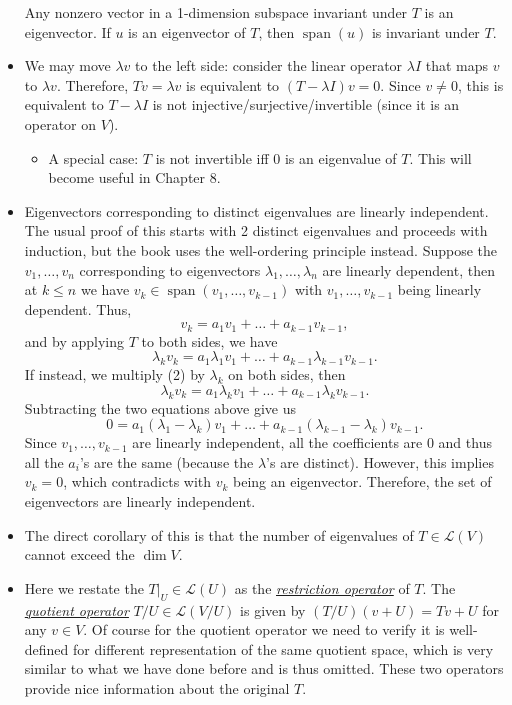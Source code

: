 \documentclass{article}
\newcommand{\df}[1]{\ul{\textit{#1}}}
\newcommand{\s}{\operatorname{span}}
\renewcommand{\d}{\dim}
\newcommand{\LV}{\mathcal{L}(V)}
\newcommand{\bv}{v_1,\dots,v_n}
\begin{document}
\begin{itemize}
    Any nonzero vector in a 1-dimension subspace invariant under $T$ is an eigenvector. If $u$ is an eigenvector of $T$, then $\s(u)$ is invariant under $T$.
    \item We may move $\lambda v$ to the left side: consider the linear operator $\lambda I$ that maps $v$ to $\lambda v$. Therefore, $Tv = \lambda v$ is equivalent to $(T-\lambda I) v = 0$. Since $v \not= 0$, this is equivalent to $T-\lambda I$ is not injective/surjective/invertible (since it is an operator on $V$).
    \begin{itemize}
        \item A special case: $T$ is not invertible iff 0 is an eigenvalue of $T$. This will become useful in Chapter 8.
    \end{itemize}
    \item Eigenvectors corresponding to distinct eigenvalues are linearly independent. The usual proof of this starts with 2 distinct eigenvalues and proceeds with induction, but the book uses the well-ordering principle instead. Suppose the $\bv$ corresponding to eigenvectors $\lambda_1,\dots,\lambda_n$ are linearly dependent, then at $k \leq n$ we have $v_k \in \s(v_1,\dots,v_{k-1})$ with $v_1,\dots,v_{k-1}$ being linearly dependent. Thus, 
    \begin{equation}
        v_k = a_1 v_1 + \dots + a_{k-1}v_{k-1},
    \end{equation}
    and by applying $T$ to both sides, we have $$\lambda_k v_k = a_1 \lambda_1 v_1 + \dots + a_{k-1} \lambda_{k-1}v_{k-1}.$$ If instead, we multiply (2) by $\lambda_k$ on both sides, then $$\lambda_k v_k = a_1 \lambda_k v_1 + \dots + a_{k-1} \lambda_k v_{k-1}.$$ Subtracting the two equations above give us $$0 = a_1 (\lambda_1 - \lambda_k) v_1 + \dots + a_{k-1} (\lambda_{k-1}-\lambda_k) v_{k-1}.$$ Since $v_1, \dots, v_{k-1}$ are linearly independent, all the coefficients are 0 and thus all the $a_i$'s are the same (because the $\lambda$'s are distinct). However, this implies $v_k = 0$, which contradicts with $v_k$ being an eigenvector. Therefore, the set of eigenvectors are linearly independent.
    \item The direct corollary of this is that the number of eigenvalues of $T \in \LV$ cannot exceed the $\d V$.
    \item Here we restate the $T|_U \in \mathcal{L}(U)$ as the \df{restriction operator} of $T$. The \df{quotient operator} $T/U \in \mathcal{L}(V/U)$ is given by $(T/U)(v+U) = Tv+U$ for any $v \in V$. Of course for the quotient operator we need to verify it is well-defined for different representation of the same quotient space, which is very similar to what we have done before and is thus omitted. These two operators provide nice information about the original $T$.
\end{itemize}
\end{document}
